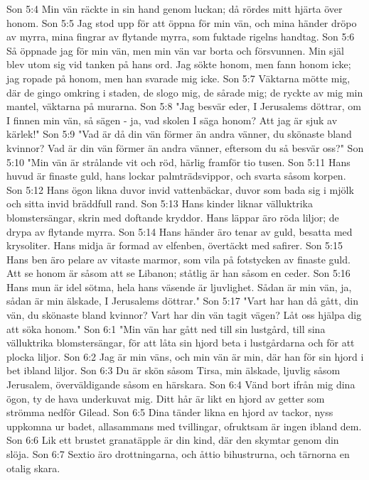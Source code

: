 Son 5:4  Min vän räckte in sin hand genom luckan; då rördes mitt hjärta över honom.
Son 5:5  Jag stod upp för att öppna för min vän, och mina händer dröpo av myrra, mina fingrar av flytande myrra, som fuktade rigelns handtag.
Son 5:6  Så öppnade jag för min vän, men min vän var borta och försvunnen. Min själ blev utom sig vid tanken på hans ord. Jag sökte honom, men fann honom icke; jag ropade på honom, men han svarade mig icke.
Son 5:7  Väktarna mötte mig, där de gingo omkring i staden, de slogo mig, de sårade mig; de ryckte av mig min mantel, väktarna på murarna.
Son 5:8  "Jag besvär eder, I Jerusalems döttrar, om I finnen min vän, så sägen - ja, vad skolen I säga honom? Att jag är sjuk av kärlek!"
Son 5:9  "Vad är då din vän förmer än andra vänner, du skönaste bland kvinnor? Vad är din vän förmer än andra vänner, eftersom du så besvär oss?"
Son 5:10  "Min vän är strålande vit och röd, härlig framför tio tusen.
Son 5:11  Hans huvud är finaste guld, hans lockar palmträdsvippor, och svarta såsom korpen.
Son 5:12  Hans ögon likna duvor invid vattenbäckar, duvor som bada sig i mjölk och sitta invid bräddfull rand.
Son 5:13  Hans kinder liknar välluktrika blomstersängar, skrin med doftande kryddor. Hans läppar äro röda liljor; de drypa av flytande myrra.
Son 5:14  Hans händer äro tenar av guld, besatta med krysoliter. Hans midja är formad av elfenben, övertäckt med safirer.
Son 5:15  Hans ben äro pelare av vitaste marmor, som vila på fotstycken av finaste guld. Att se honom är såsom att se Libanon; ståtlig är han såsom en ceder.
Son 5:16  Hans mun är idel sötma, hela hans väsende är ljuvlighet. Sådan är min vän, ja, sådan är min älskade, I Jerusalems döttrar."
Son 5:17  "Vart har han då gått, din vän, du skönaste bland kvinnor? Vart har din vän tagit vägen? Låt oss hjälpa dig att söka honom."
Son 6:1  "Min vän har gått ned till sin lustgård, till sina välluktrika blomstersängar, för att låta sin hjord beta i lustgårdarna och för att plocka liljor.
Son 6:2  Jag är min väns, och min vän är min, där han för sin hjord i bet ibland liljor.
Son 6:3  Du är skön såsom Tirsa, min älskade, ljuvlig såsom Jerusalem, överväldigande såsom en härskara.
Son 6:4  Vänd bort ifrån mig dina ögon, ty de hava underkuvat mig. Ditt hår är likt en hjord av getter som strömma nedför Gilead.
Son 6:5  Dina tänder likna en hjord av tackor, nyss uppkomna ur badet, allasammans med tvillingar, ofruktsam är ingen ibland dem.
Son 6:6  Lik ett brustet granatäpple är din kind, där den skymtar genom din slöja.
Son 6:7  Sextio äro drottningarna, och åttio bihustrurna, och tärnorna en otalig skara.
